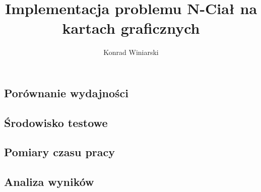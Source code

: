 \documentclass[12pt]{article}
\author{Konrad Winiarski}
\title{Implementacja problemu N-Ciał na kartach graficznych}
\begin{document}
\maketitle
\pagebreak

\begin{flushleft}













\section { Porównanie wydajności }
\subsection {Środowisko testowe}
\subsection {Pomiary czasu pracy}
\subsection {Analiza wyników}





\end{flushleft}
\end{document}
